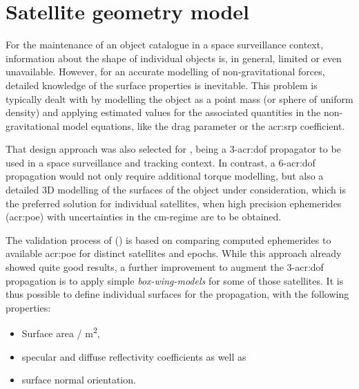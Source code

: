 \section{Satellite geometry model}
\label{sec:propagation-satellite-model}

For the maintenance of an object catalogue in a space surveillance context, information about the shape of individual objects is, in general, limited or 
even unavailable. However, for an accurate modelling of non-gravitational forces, detailed knowledge of the surface properties is inevitable. This problem 
is typically dealt with by modelling the object as a point mass (or sphere of uniform density) and applying estimated values for the associated quantities in the 
non-gravitational model equations, like the drag parameter or the \gls{acr:srp} coefficient.

That design approach was also selected for \neptune, being a 3-\gls{acr:dof} propagator to be used in a space surveillance and tracking context. 
In contrast, a 6-\gls{acr:dof} propagation would not only require additional torque modelling, but also a detailed 3D modelling of the surfaces of the object under
consideration, which is the preferred solution for individual satellites, when high precision ephemerides (\acrshort{acr:poe}) with uncertainties in the cm-regime are to be
obtained. 

The validation process of \neptune () is based on comparing computed ephemerides to available \gls{acr:poe} for distinct satellites and epochs. While this 
approach already showed quite good results, a further improvement to augment the 3-\gls{acr:dof} propagation is to apply simple \textit{box-wing-models} for some of those
satellites. It is thus possible to define individual surfaces for the \neptune propagation, with the following properties:
\begin{itemize}
 \item Surface area / \si{\metre\squared},
 \item specular and diffuse reflectivity coefficients as well as
 \item surface normal orientation. 
\end{itemize}

